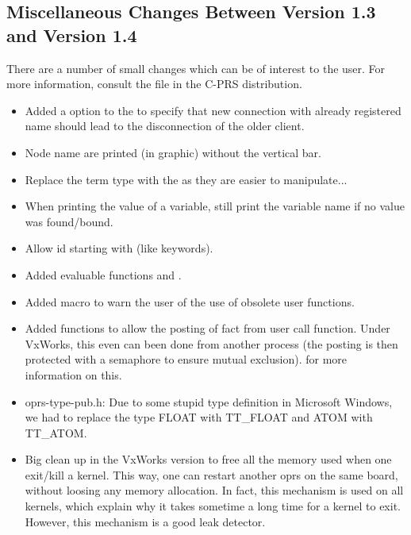 \subsection{Miscellaneous Changes Between Version 1.3 and Version 1.4}

There are a number of small changes which can be of interest to the user. For
more information, consult the  file in the C-PRS distribution.

\begin{itemize}

\item Added a  option to the \MPA{} to specify that new connection with
already registered name should lead to the disconnection of the older client.

\item Node name are printed (in graphic) without the vertical bar. 

\item Replace the  term type with the
 as they are easier to manipulate...

\item When printing the value of a variable, still print the variable name if
no value was found/bound.

\item Allow id starting with \samp{:} (like keywords). 

\item Added evaluable functions  and .

\item Added macro to warn the user of the use of obsolete user functions.

\item Added functions to allow the posting of fact from user call function.
Under VxWorks, this even can been done from another process (the posting is
then protected with a semaphore to ensure mutual exclusion).  for more information on this.

\item oprs-type-pub.h: Due to some stupid type definition in Microsoft Windows,
we had to replace the type FLOAT with TT\_FLOAT and ATOM with TT\_ATOM.

\item Big clean up in the VxWorks version to free all the memory used
when one exit/kill a kernel. This way, one can restart another oprs on
the same board, without loosing any memory allocation. In fact, this mechanism
is used on all kernels, which explain why it takes sometime a long time for a
kernel to exit. However, this mechanism is a good leak detector.


\end{itemize}
